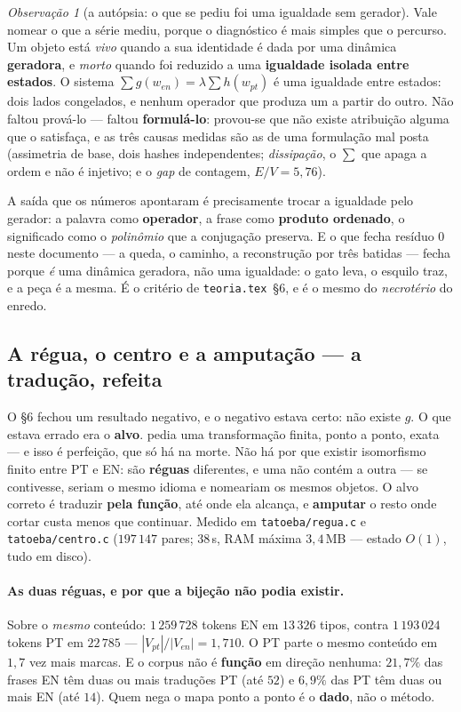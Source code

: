 \documentclass[11pt]{article}
\newcommand{\code}[1]{\texttt{\small #1}}
\theoremstyle{plain}
\theoremstyle{remark}
\newtheorem{obs}{Observação}
\begin{document}
\begin{obs}[a autópsia: o que se pediu foi uma igualdade sem gerador]
Vale nomear o que a série mediu, porque o diagnóstico é mais simples que o percurso. Um objeto está
\emph{vivo} quando a sua identidade é dada por uma dinâmica \textbf{geradora}, e \emph{morto} quando foi
reduzido a uma \textbf{igualdade isolada entre estados}. O sistema
$\sum g(w_{en})=\lambda\sum h(w_{pt})$ é uma igualdade entre estados: dois lados congelados, e nenhum
operador que produza um a partir do outro. Não faltou prová-lo --- faltou \textbf{formulá-lo}: provou-se
que não existe atribuição alguma que o satisfaça, e as três causas medidas são as de uma formulação mal
posta (assimetria de base, dois hashes independentes; \emph{dissipação}, o $\sum$ que apaga a ordem e
não é injetivo; e o \emph{gap} de contagem, $E/V=5{,}76$).

A saída que os números apontaram é precisamente trocar a igualdade pelo gerador: a palavra como
\textbf{operador}, a frase como \textbf{produto ordenado}, o significado como o \emph{polinômio} que a
conjugação preserva. E o que fecha resíduo $0$ neste documento --- a queda, o caminho, a reconstrução
por três batidas --- fecha porque \emph{é} uma dinâmica geradora, não uma igualdade: o gato leva, o
esquilo traz, e a peça é a mesma. É o critério de \texttt{teoria.tex}~§6, e é o mesmo do
\emph{necrotério} do enredo.
\end{obs}

\subsection{A régua, o centro e a amputação --- a tradução, refeita}

O §6 fechou um resultado negativo, e o negativo estava certo: não existe $g$. O que estava errado era
o \textbf{alvo}. pedia uma transformação finita, ponto a ponto, exata --- e isso é perfeição, que só
há na morte. Não há por que existir isomorfismo finito entre PT e EN: são \textbf{réguas} diferentes, e
uma não contém a outra --- se contivesse, seriam o mesmo idioma e nomeariam os mesmos objetos. O alvo
correto é traduzir \textbf{pela função}, até onde ela alcança, e \textbf{amputar} o resto onde cortar
custa menos que continuar. Medido em \code{tatoeba/regua.c} e \code{tatoeba/centro.c}
($197\,147$ pares; $38\,$s, RAM máxima $3{,}4\,$MB --- estado $O(1)$, tudo em disco).

\paragraph{As duas réguas, e por que a bijeção não podia existir.} Sobre o \emph{mesmo} conteúdo:
$1\,259\,728$ tokens EN em $13\,326$ tipos, contra $1\,193\,024$ tokens PT em $22\,785$ ---
$|V_{pt}|/|V_{en}|=1{,}710$. O PT parte o mesmo conteúdo em $1{,}7$ vez mais marcas. E o corpus não é
\textbf{função} em direção nenhuma: $21{,}7\%$ das frases EN têm duas ou mais traduções PT (até $52$) e
$6{,}9\%$ das PT têm duas ou mais EN (até $14$). Quem nega o mapa ponto a ponto é o \textbf{dado}, não
o método.
\end{document}

